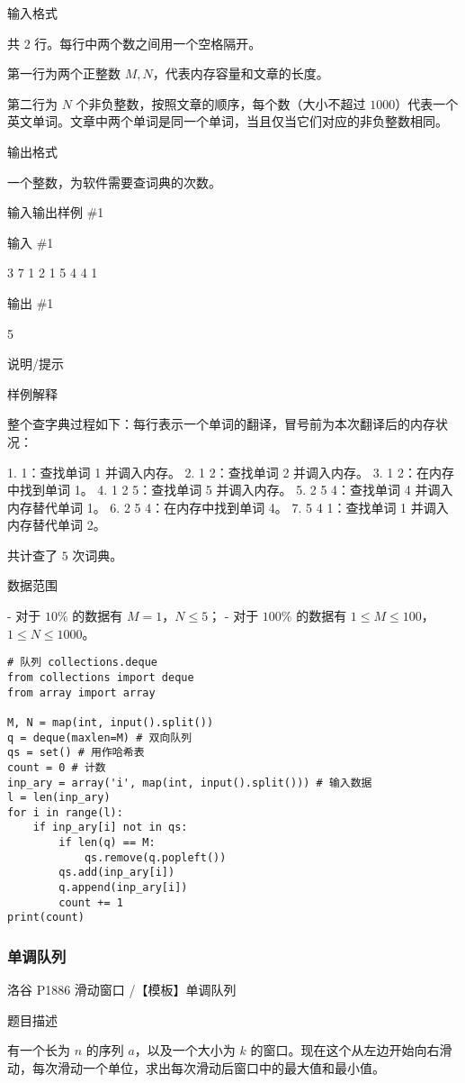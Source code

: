 \documentclass[../main]{subfiles}
\begin{document}
输入格式

共 $2$ 行。每行中两个数之间用一个空格隔开。

第一行为两个正整数 $M,N$，代表内存容量和文章的长度。

第二行为 $N$ 个非负整数，按照文章的顺序，每个数（大小不超过 $1000$）代表一个英文单词。文章中两个单词是同一个单词，当且仅当它们对应的非负整数相同。

输出格式

一个整数，为软件需要查词典的次数。

输入输出样例 \#1

输入 \#1

3 7
1 2 1 5 4 4 1

输出 \#1

5

说明/提示

样例解释

整个查字典过程如下：每行表示一个单词的翻译，冒号前为本次翻译后的内存状况：

1. 1：查找单词 1 并调入内存。
2. 1 2：查找单词 2 并调入内存。
3. 1 2：在内存中找到单词 1。
4. 1 2 5：查找单词 5 并调入内存。
5. 2 5 4：查找单词 4 并调入内存替代单词 1。
6. 2 5 4：在内存中找到单词 4。
7. 5 4 1：查找单词 1 并调入内存替代单词 2。

共计查了 $5$ 次词典。

数据范围

- 对于 $10\%$ 的数据有 $M=1$，$N \leq 5$；
- 对于 $100\%$ 的数据有 $1 \leq M \leq 100$，$1 \leq N \leq 1000$。


\begin{lstlisting}[style = Python]
# 队列 collections.deque
from collections import deque
from array import array

M, N = map(int, input().split())
q = deque(maxlen=M) # 双向队列
qs = set() # 用作哈希表
count = 0 # 计数
inp_ary = array('i', map(int, input().split())) # 输入数据
l = len(inp_ary)
for i in range(l):
    if inp_ary[i] not in qs:
        if len(q) == M:
            qs.remove(q.popleft())
        qs.add(inp_ary[i])
        q.append(inp_ary[i])
        count += 1
print(count)
\end{lstlisting}

\subsubsection{单调队列}

洛谷 P1886 滑动窗口 /【模板】单调队列

题目描述

有一个长为 $n$ 的序列 $a$，以及一个大小为 $k$ 的窗口。现在这个从左边开始向右滑动，每次滑动一个单位，求出每次滑动后窗口中的最大值和最小值。
\end{document}
